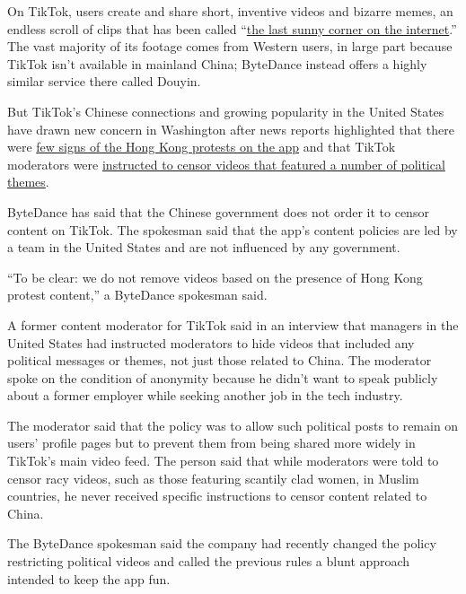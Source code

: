On TikTok, users create and share short, inventive videos and bizarre
memes, an endless scroll of clips that has been called
``\href{https://www.newyorker.com/magazine/2019/09/30/how-tiktok-holds-our-attention}{the
last sunny corner on the internet}.'' The vast majority of its footage
comes from Western users, in large part because TikTok isn't available
in mainland China; ByteDance instead offers a highly similar service
there called Douyin.

But TikTok's Chinese connections and growing popularity in the United
States have drawn new concern in Washington after news reports
highlighted that there were
\href{https://www.washingtonpost.com/technology/2019/09/15/tiktoks-beijing-roots-fuel-censorship-suspicion-it-builds-huge-us-audience/}{few
signs of the Hong Kong protests on the app} and that TikTok moderators
were
\href{https://www.theguardian.com/technology/2019/sep/25/revealed-how-tiktok-censors-videos-that-do-not-please-beijing}{instructed
to censor videos that featured a number of political themes}.

ByteDance has said that the Chinese government does not order it to
censor content on TikTok. The spokesman said that the app's content
policies are led by a team in the United States and are not influenced
by any government.

``To be clear: we do not remove videos based on the presence of Hong
Kong protest content,'' a ByteDance spokesman said.

A former content moderator for TikTok said in an interview that managers
in the United States had instructed moderators to hide videos that
included any political messages or themes, not just those related to
China. The moderator spoke on the condition of anonymity because he
didn't want to speak publicly about a former employer while seeking
another job in the tech industry.

The moderator said that the policy was to allow such political posts to
remain on users' profile pages but to prevent them from being shared
more widely in TikTok's main video feed. The person said that while
moderators were told to censor racy videos, such as those featuring
scantily clad women, in Muslim countries, he never received specific
instructions to censor content related to China.

The ByteDance spokesman said the company had recently changed the policy
restricting political videos and called the previous rules a blunt
approach intended to keep the app fun.

